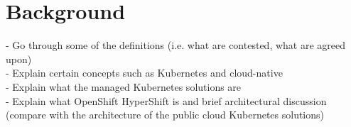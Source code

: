 




\chapter{Background}\label{background}

- Go through some of the definitions (i.e. what are contested, what are agreed upon)\\
- Explain certain concepts such as Kubernetes and cloud-native\\
- Explain what the managed Kubernetes solutions are\\
- Explain what OpenShift HyperShift is and brief architectural discussion (compare with the architecture of the public cloud Kubernetes solutions)\\

